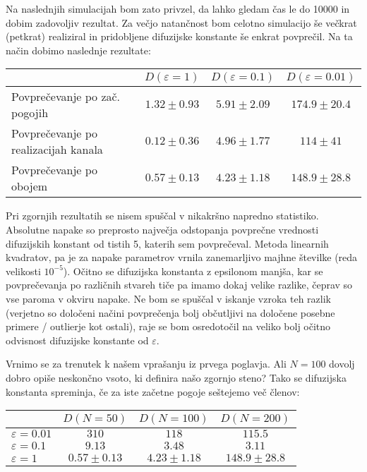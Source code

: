 \documentclass{article}
\begin{document}
Na naslednjih simulacijah bom zato privzel, da lahko gledam čas le do 10000 in dobim zadovoljiv rezultat. Za večjo natančnost bom celotno simulacijo še večkrat (petkrat) realiziral in pridobljene difuzijske konstante še enkrat povprečil. Na ta način dobimo naslednje rezultate:
\begin{center}
\begin{tabular}{ |  l  | c   c  c | }
\hline
    & $D(\varepsilon=1)$ & $D(\varepsilon=0.1)$ & $D(\varepsilon=0.01)$ \\ \hline
  Povprečevanje po zač. pogojih & $1.32 \pm 0.93$  & $5.91 \pm 2.09$ & $174.9 \pm 20.4$ \\
  Povprečevanje po realizacijah kanala & $0.12 \pm 0.36$ & $4.96 \pm 1.77$ & $114 \pm 41$ \\
  Povprečevanje po obojem & $0.57 \pm 0.13$ & $4.23 \pm 1.18$ & $148.9 \pm 28.8$\\
\hline
\end{tabular}
\end{center}
Pri zgornjih rezultatih se nisem spuščal v nikakršno napredno statistiko. Absolutne napake so preprosto največja odstopanja povprečne vrednosti difuzijskih konstant od tistih 5, katerih sem povprečeval. Metoda linearnih kvadratov, pa je za napake parametrov vrnila zanemarljivo majhne številke (reda velikosti $10^{-5}$). Očitno se difuzijska konstanta z epsilonom manjša, kar se povprečevanja po različnih stvareh tiče pa imamo dokaj velike razlike, čeprav so vse paroma v okviru napake. Ne bom se spuščal v iskanje vzroka teh razlik (verjetno so določeni načini povprečenja bolj občutljivi na določene posebne primere / outlierje kot ostali), raje se bom osredotočil na veliko bolj očitno odvisnost difuzijske konstante od $\varepsilon$.



Vrnimo se za trenutek k našem vprašanju iz prvega poglavja. Ali $N=100$ dovolj dobro opiše neskončno vsoto, ki definira našo zgornjo steno? Tako se difuzijska konstanta spreminja, če za iste začetne pogoje seštejemo več členov:

\begin{center}
\begin{tabular}{ |  l  | c   c  c | }
\hline
    & $D(N=50)$ & $D(N=100)$ & $D(N=200)$ \\ \hline
  $\varepsilon=0.01$ & $310$  & $118$ & $115.5$ \\
  $\varepsilon=0.1$ & $9.13$ & $3.48$ & $3.11$ \\
  $\varepsilon=1$ & $0.57 \pm 0.13$ & $4.23 \pm 1.18$ & $148.9 \pm 28.8$\\
\hline
\end{tabular}
\end{center}
\end{document}
